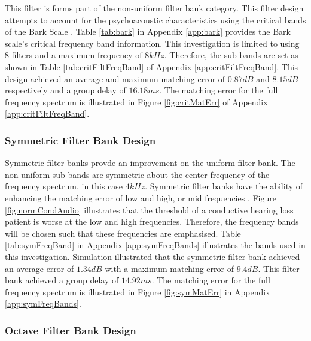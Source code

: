 \documentclass[12pt, onecolumn]{article}
\begin{document}
\noindent This filter is forms part of the non-uniform filter bank category. This filter design attempts to account for the psychoacoustic characteristics using the critical bands of the Bark Scale \cite{chong}. Table \ref{tab:bark} in Appendix \ref{app:bark} provides the Bark scale's critical frequency band information. This investigation is limited to using $8$ filters and a maximum frequency of $8kHz$. Therefore, the sub-bands are set as shown in Table \ref{tab:critFiltFreqBand} of Appendix \ref{app:critFiltFreqBand}.	This design achieved an average and maximum matching error of $0.87dB$ and $8.15dB$ respectively and a group delay of $16.18ms$. The matching error for the full frequency spectrum is illustrated in Figure \ref{fig:critMatErr} of Appendix \ref{app:critFiltFreqBand}.


\subsubsection{Symmetric Filter Bank Design}
\label{sec:symmDesign}

\noindent Symmetric filter banks provde an improvement on the uniform filter bank. The non-uniform sub-bands are symmetric about the center frequency of the frequency spectrum, in this case $4kHz$. Symmetric filter banks have the ability of enhancing the matching error of low and high, or mid frequencies \cite{sebastian}. Figure \ref{fig:normCondAudio} illustrates that the threshold of a conductive hearing loss patient is worse at the low and high frequencies. Therefore, the frequency bands will be chosen such that these frequencies are emphasised. Table \ref{tab:symFreqBand} in Appendix \ref{app:symFreqBands} illustrates the bands used in this investigation. Simulation illustrated that the symmetric filter bank achieved an average error of $1.34dB$ with a maximum matching error of $9.4dB$. This filter bank achieved a group delay of $14.92ms$. The matching error for the full frequency spectrum is illustrated in Figure \ref{fig:symMatErr} in Appendix \ref{app:symFreqBands}.


\subsubsection{Octave Filter Bank Design}
\label{sec:octDesign}
\end{document}
